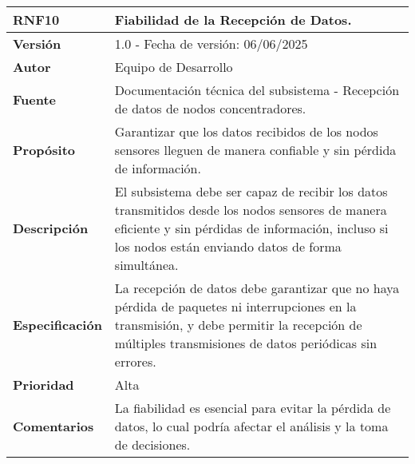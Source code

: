 \begin{longtable}{|l|p{12cm}|}
\hline
\textbf{RNF10} & \textbf{Fiabilidad de la Recepción de Datos.} \\
\hline
\endfirsthead
\hline
\textbf{Versión} & 1.0 - Fecha de versión: 06/06/2025 \\
\hline
\textbf{Autor} & Equipo de Desarrollo \\
\hline
\textbf{Fuente} & Documentación técnica del subsistema - Recepción de datos de nodos concentradores. \\
\hline
\textbf{Propósito} & Garantizar que los datos recibidos de los nodos sensores lleguen de manera confiable y sin pérdida de información. \\
\hline
\textbf{Descripción} & El subsistema debe ser capaz de recibir los datos transmitidos desde los nodos sensores de manera eficiente y sin pérdidas de información, incluso si los nodos están enviando datos de forma simultánea. \\
\hline
\textbf{Especificación} & La recepción de datos debe garantizar que no haya pérdida de paquetes ni interrupciones en la transmisión, y debe permitir la recepción de múltiples transmisiones de datos periódicas sin errores. \\
\hline
\textbf{Prioridad} & Alta \\
\hline
\textbf{Comentarios} & La fiabilidad es esencial para evitar la pérdida de datos, lo cual podría afectar el análisis y la toma de decisiones. \\
\hline
\end{longtable}

